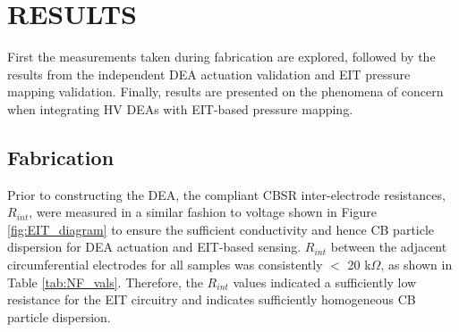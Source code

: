 \section{RESULTS} %
\label{sec:results}
First the measurements taken during fabrication are explored, followed by the results from the independent DEA actuation validation and EIT pressure mapping validation. Finally, results are presented on the phenomena of concern when integrating HV DEAs with EIT-based pressure mapping.


\subsection{Fabrication}
\label{subsec:fab_results}
Prior to constructing the DEA, the compliant CBSR inter-electrode resistances, $R_{int}$, were measured  in a similar fashion to voltage shown in Figure \ref{fig:EIT_diagram} to ensure the sufficient conductivity and hence CB particle dispersion for DEA actuation and EIT-based sensing. $R_{int}$ between the adjacent circumferential electrodes for all samples was consistently $<$ 20 k$\Omega$, as shown in Table \ref{tab:NF_vals}. Therefore, the $R_{int}$ values indicated a sufficiently low resistance for the EIT circuitry and indicates sufficiently homogeneous CB particle dispersion.


